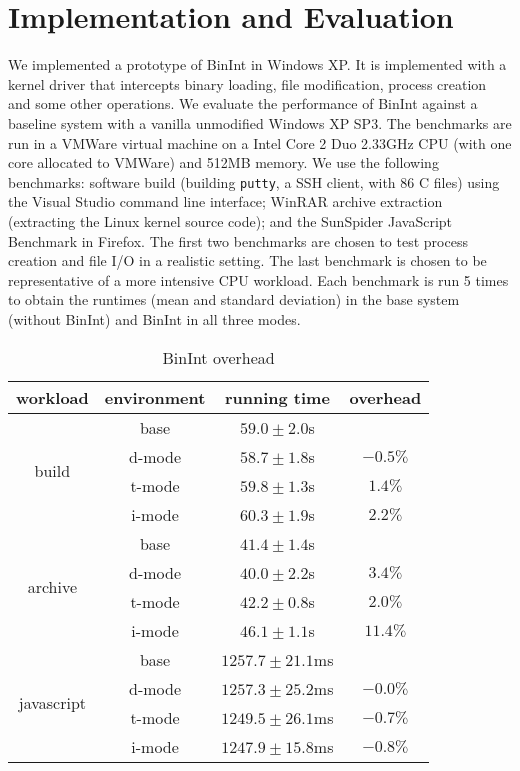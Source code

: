 \section{Implementation and Evaluation}
\label{sec:imp}

We implemented a prototype of BinInt in Windows XP.
It is implemented with a kernel driver that intercepts binary loading,
file modification, process creation and some other operations.
We evaluate the performance of BinInt against
a baseline system with a vanilla unmodified Windows XP SP3.
The benchmarks are run in a VMWare virtual machine 
on a Intel Core 2 Duo 2.33GHz CPU (with one core allocated to VMWare) 
and 512MB memory.
We use the following benchmarks:
software build (building {\tt putty}, a SSH client, with 86 C files) using
the Visual Studio command line interface;
WinRAR archive extraction (extracting the Linux kernel source code);
and the SunSpider JavaScript Benchmark in Firefox.
The first two benchmarks are chosen to test
process creation and file I/O in a realistic setting.
The last benchmark is chosen to be representative of
a more intensive CPU workload.
Each benchmark is run 5 times to obtain
the runtimes (mean and standard deviation) in the base system (without BinInt)
and BinInt in all three modes.

\begin{table}[tb]
\centering
\begin{tabular}{|c|c|c|c|}
\hline
workload & environment & running time & overhead \\ \hline \hline
\multirow{4}{*}{build} &
  base   & $59.0\pm2.0$s & \\ \cline{2-4}
& d-mode & $58.7\pm1.8$s & $-0.5\%$ \\ \cline{2-4}
& t-mode & $59.8\pm1.3$s & $1.4\%$ \\ \cline{2-4}
& i-mode & $60.3\pm1.9$s & $2.2\%$ \\ \hline
\multirow{4}{*}{archive} &
  base   & $41.4\pm1.4$s & \\ \cline{2-4}
& d-mode & $40.0\pm2.2$s & $3.4\%$ \\ \cline{2-4}
& t-mode & $42.2\pm0.8$s & $2.0\%$ \\ \cline{2-4}
& i-mode & $46.1\pm1.1$s & $11.4\%$ \\ \hline
\multirow{4}{*}{javascript} &
  base   & $1257.7\pm21.1$ms & \\ \cline{2-4}
& d-mode & $1257.3\pm25.2$ms & $-0.0\%$ \\ \cline{2-4}
& t-mode & $1249.5\pm26.1$ms & $-0.7\%$ \\ \cline{2-4}
& i-mode & $1247.9\pm15.8$ms & $-0.8\%$ \\ \hline
\end{tabular}
\caption{BinInt overhead}
\label{table:benchmark}
\end{table}

